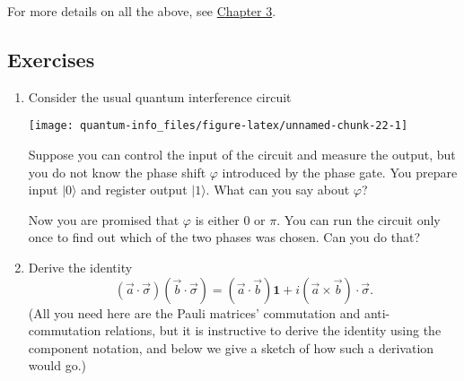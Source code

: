 \documentclass[fleqn]{article}
\begin{document}
For more details on all the above, see \protect\hyperlink{chapter3}{Chapter 3}.

\hypertarget{exercises}{%
\subsection{Exercises}\label{exercises}}

\begin{enumerate}
\def\labelenumi{\arabic{enumi}.}
\item
  Consider the usual quantum interference circuit

  \begin{center}\texttt{[image: quantum-info\_files/figure-latex/unnamed-chunk-22-1]} \end{center}

  Suppose you can control the input of the circuit and measure the output, but you do not know the phase shift \(\varphi\) introduced by the phase gate.
  You prepare input \(|0\rangle\) and register output \(|1\rangle\).
  What can you say about \(\varphi\)?

  Now you are promised that \(\varphi\) is either \(0\) or \(\pi\).
  You can run the circuit only once to find out which of the two phases was chosen.
  Can you do that?
\item
  Derive the identity
  \[
     (\vec{a}\cdot\vec{\sigma})(\vec{b}\cdot\vec{\sigma})
     = (\vec{a}\cdot\vec{b})\mathbf{1}+ i(\vec{a}\times \vec{b})\cdot \vec{\sigma}.
   \]
  (All you need here are the Pauli matrices' commutation and anti-commutation relations, but it is instructive to derive the identity using the component notation, and below we give a sketch of how such a derivation would go.)


\end{enumerate}
\end{document}
